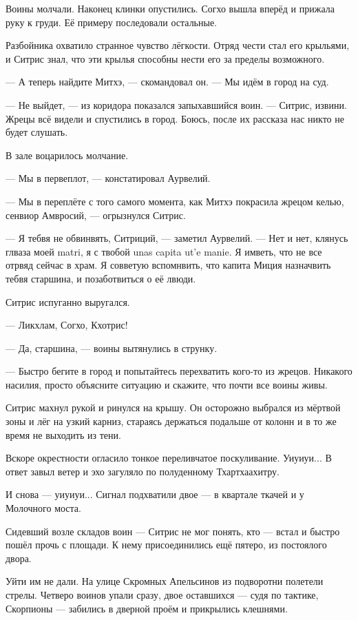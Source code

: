 Воины молчали.
Наконец клинки опустились.
Согхо вышла вперёд и прижала руку к груди.
Её примеру последовали остальные.

Разбойника охватило странное чувство лёгкости.
Отряд чести стал его крыльями, и Ситрис знал, что эти крылья способны нести его за пределы возможного.

--- А теперь найдите Митхэ, --- скомандовал он.
--- Мы идём в город на суд.

--- Не выйдет, --- из коридора показался запыхавшийся воин.
--- Ситрис, извини.
Жрецы всё видели и спустились в город.
Боюсь, после их рассказа нас никто не будет слушать.

В зале воцарилось молчание.

--- Мы в первеплот, --- констатировал Аурвелий.

--- Мы в переплёте с того самого момента, как Митхэ покрасила жрецом келью, сенвиор Амвросий, --- огрызнулся Ситрис.

--- Я тебвя не обвинвять, Ситриций, --- заметил Аурвелий.
--- Нет и нет, клянусь глваза моей matri, я с твобой unas capita ut'e manie\FM.
Я имветь, что не все отрвяд сейчас в храм.
Я совветую вспомнвить, что капита Миция назначвить тебвя старшина, и позаботвиться о её лвюди.

Ситрис испуганно выругался.

--- Ликхлам, Согхо, Кхотрис!

--- Да, старшина, --- воины вытянулись в струнку.

--- Быстро бегите в город и попытайтесь перехватить кого-то из жрецов.
Никакого насилия, просто объясните ситуацию и скажите, что почти все воины живы.

Ситрис махнул рукой и ринулся на крышу.
Он осторожно выбрался из мёртвой зоны и лёг на узкий карниз, стараясь держаться подальше от колонн и в то же время не выходить из тени.

Вскоре окрестности огласило тонкое переливчатое поскуливание.
Уиуиуи...
В ответ завыл ветер и эхо загуляло по полуденному Тхартхаахитру.

И снова --- уиуиуи...
Сигнал подхватили двое --- в квартале ткачей и у Молочного моста.

Сидевший возле складов воин --- Ситрис не мог понять, кто --- встал и быстро пошёл прочь с площади.
К нему присоединились ещё пятеро, из постоялого двора.

Уйти им не дали.
На улице Скромных Апельсинов из подворотни полетели стрелы.
Четверо воинов упали сразу, двое оставшихся --- судя по тактике, Скорпионы --- забились в дверной проём и прикрылись клешнями.

